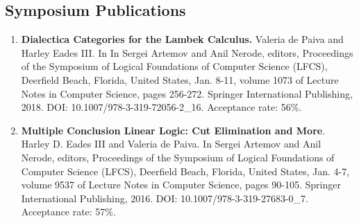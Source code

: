 \documentclass{article}
\begin{document}
  \subsection{Symposium Publications}
  \label{subsec:symposium_publications}
  \begin{enumerate}
  \item \textbf{Dialectica Categories for the Lambek Calculus.}
    Valeria de Paiva and Harley Eades III. In In Sergei Artemov
    and Anil Nerode, editors, Proceedings of the Symposium of Logical
    Foundations of Computer Science (LFCS), Deerfield Beach, Florida,
    United States, Jan. 8-11, volume 1073 of Lecture Notes in Computer
    Science, pages 256-272. Springer International Publishing,
    2018. DOI: 10.1007/978-3-319-72056-2\_16.  Acceptance rate: 56\%.

  \item \textbf{Multiple Conclusion Linear Logic: Cut Elimination and
    More}.  Harley D. Eades III and Valeria de Paiva. In Sergei Artemov
    and Anil Nerode, editors, Proceedings of the Symposium of Logical
    Foundations of Computer Science (LFCS), Deerfield Beach, Florida,
    United States, Jan. 4-7, volume 9537 of Lecture Notes in Computer
    Science, pages 90-105. Springer International Publishing,
    2016. DOI: 10.1007/978-3-319-27683-0\_7.  Acceptance rate: 57\%.
  \end{enumerate}
  
\end{document}
